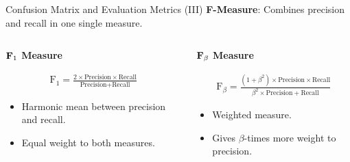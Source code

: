 \begin{frame}{Confusion Matrix and Evaluation Metrics (III)}
	\textbf{F-Measure}: Combines precision and recall in one single measure.

	\begin{columns}
		\begin{column}{0.5\textwidth}
			\begin{center}
				\textbf{$\text{\textbf{F}}_1$ Measure}
			\end{center}
			\begin{align*}
				\text{F}_1 = \frac{2 \times \text{Precision} \times \text{Recall}}{\text{Precision} + \text{Recall}}
			\end{align*}

			\begin{itemize}
				\item Harmonic mean between precision and recall.
				\item Equal weight to both measures.
			\end{itemize}
		\end{column}

		\begin{column}{0.5\textwidth}
			\begin{center}
				\textbf{$\text{\textbf{F}}_\beta$ Measure}
			\end{center}
			\vspace*{-.5em}
			\begin{align*}
				\text{F}_\beta = \frac{(1 + \beta^2) \times \text{Precision} \times \text{Recall}}{\beta^2 \times \text{Precision} + \text{Recall}}
			\end{align*}

			\begin{itemize}
				\item Weighted measure.
				\item Gives $\beta$-times more weight to precision.
			\end{itemize}
		\end{column}
	\end{columns}
\end{frame}


